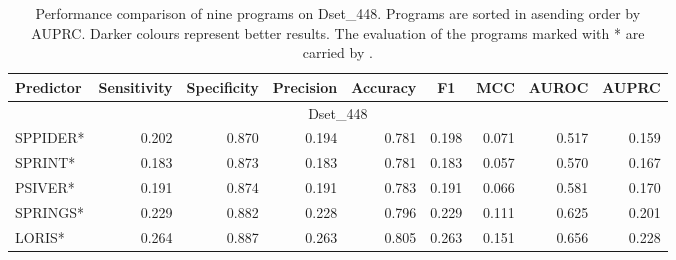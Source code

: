 \documentclass{bioinfo}
\begin{document}
\begin{table*}[htbp]
  \centering
  \caption{Performance comparison of nine programs on Dset\_448. Programs are sorted in asending order by AUPRC. Darker colours represent better results. The evaluation of the programs marked with \** are carried by \citep{zhang2019scriber}.}

    \begin{tabular}{lrrrrrrrr}
    \toprule
    \multicolumn{1}{|l}{Predictor} & \multicolumn{1}{c}{Sensitivity} & \multicolumn{1}{c}{Specificity} & \multicolumn{1}{c}{Precision} & \multicolumn{1}{c}{Accuracy} & \multicolumn{1}{c}{F1} & \multicolumn{1}{c}{MCC} & \multicolumn{1}{c}{AUROC} & \multicolumn{1}{c|}{AUPRC} \\
    \midrule
    \multicolumn{9}{|c|}{Dset\_448} \\
    \midrule
    SPPIDER* & \cellcolor[rgb]{ .933,  .953,  .922}0.202 & 0.870 & \cellcolor[rgb]{ .961,  .973,  .957}0.194 & 0.781 & \cellcolor[rgb]{ .949,  .965,  .937}0.198 & \cellcolor[rgb]{ .957,  .969,  .949}0.071 & 0.517 & 0.159 \\
    SPRINT* & 0.183 & \cellcolor[rgb]{ .937,  .953,  .925}0.873 & 0.183 & 0.781 & 0.183 & 0.057 & \cellcolor[rgb]{ .839,  .882,  .812}0.570 & \cellcolor[rgb]{ .973,  .98,  .965}0.167 \\
    PSIVER* & \cellcolor[rgb]{ .973,  .98,  .969}0.191 & \cellcolor[rgb]{ .918,  .937,  .902}0.874 & \cellcolor[rgb]{ .973,  .98,  .969}0.191 & \cellcolor[rgb]{ .973,  .98,  .969}0.783 & \cellcolor[rgb]{ .973,  .98,  .969}0.191 & \cellcolor[rgb]{ .973,  .98,  .969}0.066 & \cellcolor[rgb]{ .808,  .859,  .773}0.581 & \cellcolor[rgb]{ .961,  .973,  .953}0.170 \\
    SPRINGS* & \cellcolor[rgb]{ .839,  .882,  .808}0.229 & \cellcolor[rgb]{ .745,  .812,  .698}0.882 & \cellcolor[rgb]{ .843,  .886,  .812}0.228 & \cellcolor[rgb]{ .792,  .847,  .753}0.796 & \cellcolor[rgb]{ .839,  .882,  .808}0.229 & \cellcolor[rgb]{ .835,  .878,  .804}0.111 & \cellcolor[rgb]{ .675,  .761,  .612}0.625 & \cellcolor[rgb]{ .843,  .886,  .816}0.201 \\
    LORIS* & \cellcolor[rgb]{ .714,  .792,  .659}0.264 & \cellcolor[rgb]{ .635,  .733,  .569}0.887 & \cellcolor[rgb]{ .718,  .792,  .663}0.263 & \cellcolor[rgb]{ .667,  .757,  .604}0.805 & \cellcolor[rgb]{ .718,  .792,  .663}0.263 & \cellcolor[rgb]{ .71,  .788,  .655}0.151 & \cellcolor[rgb]{ .58,  .694,  .502}0.656 & \cellcolor[rgb]{ .741,  .812,  .694}0.228 \\

\end{tabular}
\end{table*}
\end{document}
